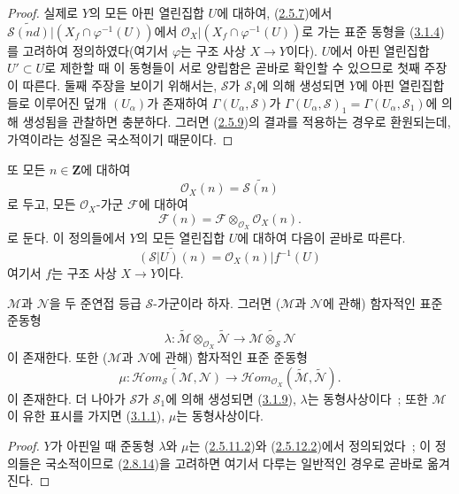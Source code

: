 \begin{proof}
실제로 $Y$의 모든 아핀 열린집합 $U$에 대하여,
(\hyperref[II.2.5.7-ko]{2.5.7})에서
$\widetilde{\mathcal{S}(nd)}|(X_f\cap\varphi^{-1}(U))$에서
$\mathcal{O}_X|(X_f\cap\varphi^{-1}(U))$로 가는 표준 동형을
(\hyperref[II.3.1.4-ko]{3.1.4})를 고려하여 정의하였다(여기서
$\varphi$는 구조 사상 $X\to Y$이다). $U$에서 아핀 열린집합
$U'\subset U$로 제한할 때 이 동형들이 서로 양립함은 곧바로 확인할 수
있으므로 첫째 주장이 따른다. 둘째 주장을 보이기 위해서는,
$\mathcal{S}$가 $\mathcal{S}_1$에 의해 생성되면 $Y$에 아핀 열린집합들로
이루어진 덮개 $(U_\alpha)$가 존재하여
$\Gamma(U_\alpha,\mathcal{S})$가
$\Gamma(U_\alpha,\mathcal{S})_1=\Gamma(U_\alpha,\mathcal{S}_1)$에
의해 생성됨을 관찰하면 충분하다. 그러면
(\hyperref[II.2.5.9-ko]{2.5.9})의 결과를 적용하는 경우로 환원되는데,
가역이라는 성질은 국소적이기 때문이다.
\end{proof}

또 모든 $n\in\mathbf{Z}$에 대하여
\[
\label{II.3.2.5.1-ko}
  \mathcal{O}_X(n)=\widetilde{\mathcal{S}(n)}
\tag{3.2.5.1}
\]
로 두고, 모든 $\mathcal{O}_X$-가군 $\mathcal{F}$에 대하여
\[
\label{II.3.2.5.2-ko}
  \mathcal{F}(n)=\mathcal{F}\otimes_{\mathcal{O}_X}\mathcal{O}_X(n).
\tag{3.2.5.2}
\]
로 둔다. 이 정의들에서 $Y$의 모든 열린집합 $U$에 대하여 다음이 곧바로
따른다.
\[
  \widetilde{(\mathcal{S}|U)(n)}
  =\mathcal{O}_X(n)|f^{-1}(U)
\]
여기서 $f$는 구조 사상 $X\to Y$이다.

\begin{proposition}[3.2.6]
\label{II.3.2.6-ko}
$\mathcal{M}$과 $\mathcal{N}$을 두 준연접 등급 $\mathcal{S}$-가군이라
하자. 그러면 ($\mathcal{M}$과 $\mathcal{N}$에 관해) 함자적인 표준 준동형
\[
\label{II.3.2.6.1-ko}
  \lambda:\widetilde{\mathcal{M}}
  \otimes_{\mathcal{O}_X}\widetilde{\mathcal{N}}
  \longrightarrow\widetilde{\mathcal{M}\otimes_{\mathcal{S}}\mathcal{N}}
\tag{3.2.6.1}
\]
이 존재한다. 또한 ($\mathcal{M}$과 $\mathcal{N}$에 관해) 함자적인 표준
준동형
\[
\label{II.3.2.6.2-ko}
  \mu:\widetilde{\mathcal{H}om_{\mathcal{S}}(\mathcal{M},\mathcal{N})}
  \longrightarrow
  \mathcal{H}om_{\mathcal{O}_X}
  (\widetilde{\mathcal{M}},\widetilde{\mathcal{N}}).
\tag{3.2.6.2}
\]
이 존재한다. 더 나아가 $\mathcal{S}$가 $\mathcal{S}_1$에 의해 생성되면
(\hyperref[II.3.1.9-ko]{3.1.9}), $\lambda$는 동형사상이다~; 또한
$\mathcal{M}$이 유한 표시를 가지면
(\hyperref[II.3.1.1-ko]{3.1.1}), $\mu$는 동형사상이다.
\end{proposition}

\begin{proof}
$Y$가 아핀일 때 준동형 $\lambda$와 $\mu$는
(\hyperref[II.2.5.11.2-ko]{2.5.11.2})와
(\hyperref[II.2.5.12.2-ko]{2.5.12.2})에서 정의되었다~; 이 정의들은
국소적이므로 (\hyperref[II.2.8.14-ko]{2.8.14})을 고려하면 여기서 다루는
일반적인 경우로 곧바로 옮겨진다.
\end{proof}

